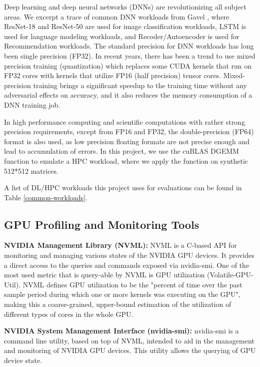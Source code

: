 \documentclass{article}
\begin{document}
Deep learning and deep neural networks (DNNs) are revolutionizing all subject areas. We excerpt a trace of common DNN workloads from Gavel \cite{gavel}, where ResNet-18 and ResNet-50 \cite{resnet} are used for image classification workloads, LSTM \cite{lstm} is used for language modeling workloads, and Recoder/Autoencoder \cite{recommendation} is used for Recommendation workloads. The standard precision for DNN workloads has long been single precision (FP32). In recent years, there has been a trend to use mixed precision training (quantization) \cite{mixed_precision} which replaces some CUDA kernels that run on FP32 cores with kernels that utilize FP16 (half precision) tensor cores. Mixed-precision training brings a significant speedup to the training time without any adversarial effects on accuracy, and it also reduces the memory consumption of a DNN training job.

In high performance computing and scientific computations with rather strong precision requirements, except from FP16 and FP32, the double-precision (FP64) format is also used, as low precision floating formats are not precise enough and lead to accumulation of errors. In this project, we use the cuBLAS \cite{cublas} DGEMM function to emulate a HPC workload, where we apply the function on synthetic 512*512 matrices.

A list of DL/HPC workloads this project uses for evaluations can be found in Table \ref{common-workloads}.


\subsection{GPU Profiling and Monitoring Tools}

\textbf{NVIDIA Management Library (NVML):} NVML \cite{nvml} is a C-based API for monitoring and managing various states of the NVIDIA GPU devices. It provides a direct access to the queries and commands exposed via nvidia-smi. One of the most used metric that is query-able by NVML is GPU utilization (Volatile-GPU-Util). NVML defines GPU utilization to be the "percent of time over the past sample period during which one or more kernels was executing on the GPU", making this a coarse-grained, upper-bound estimation of the utilization of different types of cores in the whole GPU. 

\textbf{NVIDIA System Management Interface (nvidia-smi):} nvidia-smi \cite{nvidia-smi} is a command line utility, based on top of NVML, intended to aid in the management and monitoring of NVIDIA GPU devices. This utility allows the querying of GPU device state.
\end{document}
